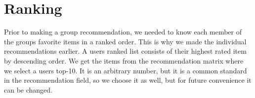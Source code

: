 \section{Ranking}\label{sec:ranking}
Prior to making a group recommendation, we needed to know each member of the groups favorite items in a ranked order. This is why we made the individual recommendations earlier. A users ranked list consists of their highest rated item by descending order. We get the items from the recommendation matrix where we select a users top-10. It is an arbitrary number, but it is a common standard in the recommendation field, so we choose it as well, but for future convenience it can be changed.

